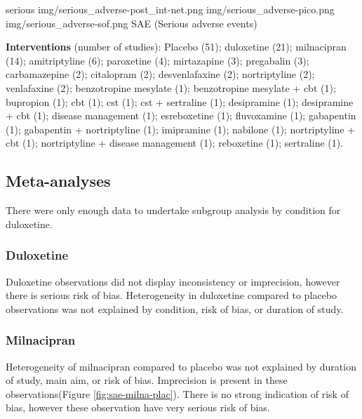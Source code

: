 \documentclass{report}\usepackage[]{graphicx}\usepackage[]{color}
\begin{document}
\soffignew
{serious}
{img/serious_adverse-post_int-net.png}
{img/serious_adverse-pico.png}
{img/serious_adverse-sof.png}
{SAE (Serious adverse events)}

\textbf{Interventions} (number of studies): Placebo (51); duloxetine (21); milnacipran (14); amitriptyline (6); paroxetine (4); mirtazapine (3); pregabalin (3); carbamazepine (2); citalopram (2); desvenlafaxine (2); nortriptyline (2); venlafaxine (2); benzotropine mesylate (1); benzotropine mesylate + cbt (1); bupropion (1); cbt (1); cst (1); cst + sertraline (1); desipramine (1); desipramine + cbt (1); disease management (1); esreboxetine (1); fluvoxamine (1); gabapentin (1); gabapentin + nortriptyline (1); imipramine (1); nabilone (1); nortriptyline + cbt (1); nortriptyline + disease management (1); reboxetine (1); sertraline (1).


\subsection{Meta-analyses}


There were only enough data to undertake subgroup analysis by condition for duloxetine.

\subsubsection{Duloxetine}

Duloxetine observations did not display inconsistency or imprecision, however there is serious risk of bias. Heterogeneity in duloxetine compared to placebo observations was not explained by condition, risk of bias, or duration of study.

\subsubsection{Milnacipran}

Heterogeneity of milnacipran compared to placebo was not explained by duration of study, main aim, or risk of bias. Imprecision is present in these observations(Figure \ref{fig:sae-milna-plac}). There is no strong indication of risk of bias, however these observation have very serious risk of bias.
\end{document}
